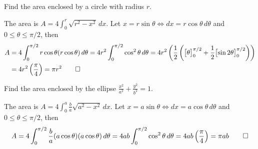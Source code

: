\begin{problem}
    Find the area enclosed by a circle with radius \(r\).
\end{problem}
\begin{solution}
    The area is \(\displaystyle{A=4\int_0^r\sqrt{r^2-x^2}\,dx}\).
    Let \(x=r\sin\theta\iff dx=r\cos\theta\,d\theta\) and
    \(0\leq\theta\leq\pi/2\), then
    \begin{align*}
        A &= 4\int_0^{\pi/2}r\cos\theta(r\cos\theta)\,d\theta
        =4r^2\int_0^{\pi/2}\cos^2\theta\,d\theta
        =4r^2\left(\frac{1}{2}\left(\bigl[\theta\bigr]_0^{\pi/2}
        +\frac{1}{2}\bigl[\sin2\theta\bigr]_0^{\pi/2}\right)\right) \\
        &= 4r^2\left(\frac{\pi}{4}\right)=\pi r^2 \qedhere
    \end{align*}
\end{solution}
\begin{problem}
    Find the area enclosed by the ellipse
    \(\displaystyle{\frac{x^2}{a^2}+\frac{y^2}{b^2}}=1\).
\end{problem}
\begin{solution}
    The area is \(\displaystyle{A=4\int_0^a\frac{b}{a}\sqrt{a^2-x^2}\,dx}\).
    Let \(x=a\sin\theta\iff dx=a\cos\theta\,d\theta\) and
    \(0\leq\theta\leq\pi/2\), then
    \[A=4\int_0^{\pi/2}\frac{b}{a}(a\cos\theta)(a\cos\theta)\,d\theta
    =4ab\int_0^{\pi/2}\cos^2\theta\,d\theta
    =4ab\left(\frac{\pi}{4}\right)=\pi ab\qedhere\]
\end{solution}
